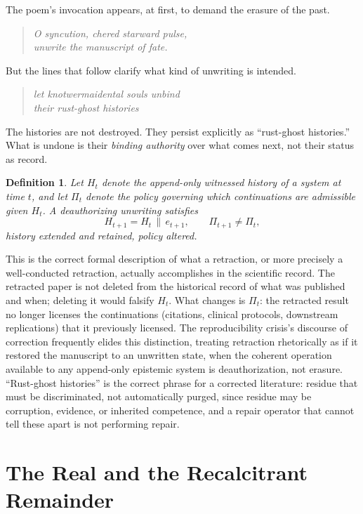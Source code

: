 \documentclass[11pt]{article}
\newtheorem{definition}{Definition}
\begin{document}
The poem's invocation appears, at first, to demand the erasure of the past.

\begin{quote}
\itshape
O syncution, chered starward pulse,\\
unwrite the manuscript of fate.
\end{quote}

But the lines that follow clarify what kind of unwriting is intended.

\begin{quote}
\itshape
let knotwermaidental souls unbind\\
their rust-ghost histories
\end{quote}

The histories are not destroyed. They persist explicitly as ``rust-ghost histories.'' What is undone is their \emph{binding authority} over what comes next, not their status as record.

\begin{definition}
Let $H_t$ denote the append-only witnessed history of a system at time $t$, and let $\Pi_t$ denote the policy governing which continuations are admissible given $H_t$. A deauthorizing unwriting satisfies
\[
H_{t+1} = H_t \,\|\, e_{t+1}, \qquad \Pi_{t+1} \neq \Pi_t,
\]
history extended and retained, policy altered.
\end{definition}

This is the correct formal description of what a retraction, or more precisely a well-conducted retraction, actually accomplishes in the scientific record. The retracted paper is not deleted from the historical record of what was published and when; deleting it would falsify $H_t$. What changes is $\Pi_t$: the retracted result no longer licenses the continuations (citations, clinical protocols, downstream replications) that it previously licensed. The reproducibility crisis's discourse of correction frequently elides this distinction, treating retraction rhetorically as if it restored the manuscript to an unwritten state, when the coherent operation available to any append-only epistemic system is deauthorization, not erasure. ``Rust-ghost histories'' is the correct phrase for a corrected literature: residue that must be discriminated, not automatically purged, since residue may be corruption, evidence, or inherited competence, and a repair operator that cannot tell these apart is not performing repair.

\section{The Real and the Recalcitrant Remainder}
\end{document}
